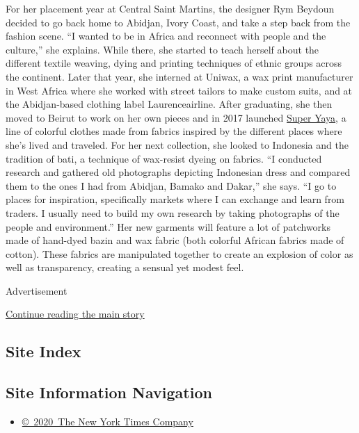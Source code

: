 For her placement year at Central Saint Martins, the designer Rym
Beydoun decided to go back home to Abidjan, Ivory Coast, and take a step
back from the fashion scene. ``I wanted to be in Africa and reconnect
with people and the culture,'' she explains. While there, she started to
teach herself about the different textile weaving, dying and printing
techniques of ethnic groups across the continent. Later that year, she
interned at Uniwax, a wax print manufacturer in West Africa where she
worked with street tailors to make custom suits, and at the
Abidjan-based clothing label Laurenceairline. After graduating, she then
moved to Beirut to work on her own pieces and in 2017 launched
\href{http://www.super-yaya.com/}{Super Yaya}, a line of colorful
clothes made from fabrics inspired by the different places where she's
lived and traveled. For her next collection, she looked to Indonesia and
the tradition of bati, a technique of wax-resist dyeing on fabrics. ``I
conducted research and gathered old photographs depicting Indonesian
dress and compared them to the ones I had from Abidjan, Bamako and
Dakar,'' she says. ``I go to places for inspiration, specifically
markets where I can exchange and learn from traders. I usually need to
build my own research by taking photographs of the people and
environment.'' Her new garments will feature a lot of patchworks made of
hand-dyed bazin and wax fabric (both colorful African fabrics made of
cotton). These fabrics are manipulated together to create an explosion
of color as well as transparency, creating a sensual yet modest feel.

Advertisement

\protect\hyperlink{after-bottom}{Continue reading the main story}

\hypertarget{site-index}{%
\subsection{Site Index}\label{site-index}}

\hypertarget{site-information-navigation}{%
\subsection{Site Information
Navigation}\label{site-information-navigation}}

\begin{itemize}
\tightlist
\item
  \href{https://help.nytimes3xbfgragh.onion/hc/en-us/articles/115014792127-Copyright-notice}{©~2020~The
  New York Times Company}
\end{itemize}

